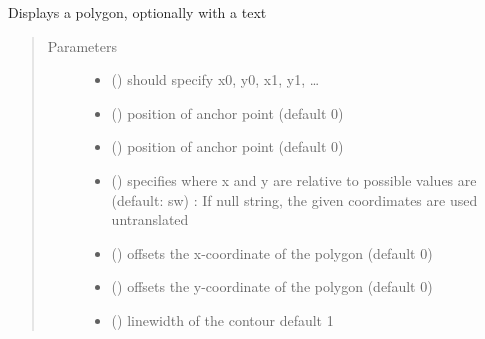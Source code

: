 \documentclass[letterpaper,10pt,english]{sphinxmanual}
\begin{document}
\begin{fulllineitems}
\label{\detokenize{Reference:salabim.AnimatePolygon}}
Displays a polygon, optionally with a text
\begin{quote}\begin{description}
\item[{Parameters}] \leavevmode\begin{itemize}
\item {} 
 () \textendash{} should specify x0, y0, x1, y1, …

\item {} 
 () \textendash{} position of anchor point (default 0)

\item {} 
 () \textendash{} position of anchor point (default 0)

\item {} 
 () \textendash{} specifies where x and y are relative to 
possible values are (default: sw) : 
If null string, the given coordimates are used untranslated

\item {} 
 () \textendash{} offsets the x-coordinate of the polygon (default 0)

\item {} 
 () \textendash{} offsets the y-coordinate of the polygon (default 0)

\item {} 
 () \textendash{} linewidth of the contour 
default 1


\end{itemize}
\end{description}
\end{quote}
\end{fulllineitems}
\end{document}
